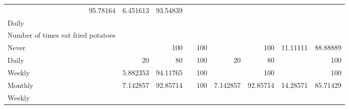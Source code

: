 \documentclass{article}
\begin{document}
\begin{table}[!h]
{\begin{tabular}{lllllllll}
				\multicolumn{1}{r}{95.78164} &
				\multicolumn{1}{r}{6.451613} &
				\multicolumn{1}{r}{93.54839} \\
				\multicolumn{1}{l}{\hspace{3em}Daily} &
				\multicolumn{1}{|r}{} &
				\multicolumn{1}{r}{} &
				\multicolumn{1}{r}{} &
				\multicolumn{1}{r}{} &
				\multicolumn{1}{r}{} &
				\multicolumn{1}{r}{} &
				\multicolumn{1}{r}{} &
				\multicolumn{1}{r}{} \\
				\multicolumn{1}{l}{\hspace{4em}Number of times eat fried potatoes} &
				\multicolumn{1}{|r}{} &
				\multicolumn{1}{r}{} &
				\multicolumn{1}{r}{} &
				\multicolumn{1}{r}{} &
				\multicolumn{1}{r}{} &
				\multicolumn{1}{r}{} &
				\multicolumn{1}{r}{} &
				\multicolumn{1}{r}{} \\
				\multicolumn{1}{l}{\hspace{5em}Never} &
				\multicolumn{1}{|r}{} &
				\multicolumn{1}{r}{100} &
				\multicolumn{1}{r}{} &
				\multicolumn{1}{r}{100} &
				\multicolumn{1}{r}{} &
				\multicolumn{1}{r}{100} &
				\multicolumn{1}{r}{11.11111} &
				\multicolumn{1}{r}{88.88889} \\
				\multicolumn{1}{l}{\hspace{5em}Daily} &
				\multicolumn{1}{|r}{20} &
				\multicolumn{1}{r}{80} &
				\multicolumn{1}{r}{} &
				\multicolumn{1}{r}{100} &
				\multicolumn{1}{r}{20} &
				\multicolumn{1}{r}{80} &
				\multicolumn{1}{r}{} &
				\multicolumn{1}{r}{100} \\
				\multicolumn{1}{l}{\hspace{5em}Weekly} &
				\multicolumn{1}{|r}{5.882353} &
				\multicolumn{1}{r}{94.11765} &
				\multicolumn{1}{r}{} &
				\multicolumn{1}{r}{100} &
				\multicolumn{1}{r}{} &
				\multicolumn{1}{r}{100} &
				\multicolumn{1}{r}{} &
				\multicolumn{1}{r}{100} \\
				\multicolumn{1}{l}{\hspace{5em}Monthly} &
				\multicolumn{1}{|r}{7.142857} &
				\multicolumn{1}{r}{92.85714} &
				\multicolumn{1}{r}{} &
				\multicolumn{1}{r}{100} &
				\multicolumn{1}{r}{7.142857} &
				\multicolumn{1}{r}{92.85714} &
				\multicolumn{1}{r}{14.28571} &
				\multicolumn{1}{r}{85.71429} \\
				\multicolumn{1}{l}{\hspace{3em}Weekly} &
				\multicolumn{1}{|r}{} &
				\multicolumn{1}{r}{} &
				\multicolumn{1}{r}{} &
				\multicolumn{1}{r}{} &
				\multicolumn{1}{r}{} &
				\multicolumn{1}{r}{} &
				\multicolumn{1}{r}{} &

\end{tabular}}
\end{table}
\end{document}
